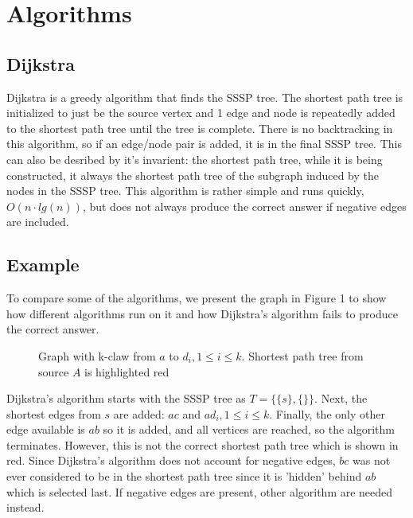 \documentclass{article}
\begin{document}
\section{Algorithms}

\subsection{Dijkstra}
Dijkstra is a greedy algorithm that finds the SSSP tree. The shortest path tree is initialized to just be the source vertex and 1 edge and node is repeatedly added to the shortest path tree until the tree is complete. There is no backtracking in this algorithm, so if an edge/node pair is added, it is in the final SSSP tree. This can also be desribed by it's invarient: the shortest path tree, while it is being constructed, it always the shortest path tree of the subgraph induced by the nodes in the SSSP tree.
This algorithm is rather simple and runs quickly, $O(n \cdot lg(n))$, but does not always produce the correct answer if negative edges are included.

\subsection{Example}
To compare some of the algorithms, we present the graph in Figure 1 to show how different algorithms run on it and how Dijkstra's algorithm fails to produce the correct answer.
\begin{figure}
	\centering
\caption{Graph with k-claw from $a$ to $d_i, 1 \leq i \leq k$. Shortest path tree from source $A$ is highlighted red}
\end{figure}
Dijkstra's algorithm starts with the SSSP tree as $T = \{\{s\}, \{\}\}$. Next, the shortest edges from $s$ are added: $ac$ and $ad_i, 1 \leq i \leq k$. Finally, the only other edge available is $ab$ so it is added, and all vertices are reached, so the algorithm terminates. However, this is not the correct shortest path tree which is shown in red. Since Dijkstra's algorithm does not account for negative edges, $bc$ was not ever considered to be in the shortest path tree since it is 'hidden' behind $ab$ which is selected last. If negative edges are present, other algorithm are needed instead.
\end{document}
